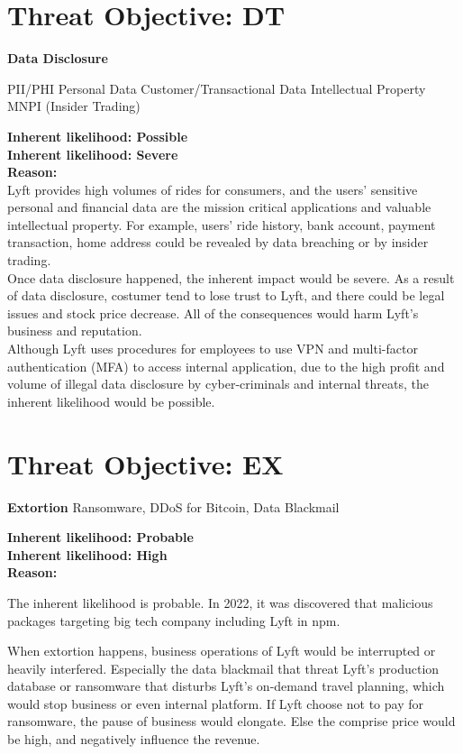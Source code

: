 \documentclass[11pt]{article}
\begin{document}
\section{Threat Objective: DT}
\textbf{Data Disclosure}

PII/PHI Personal Data
Customer/Transactional Data
Intellectual Property
MNPI (Insider Trading)


\begin{boxB}
    \textbf{Inherent likelihood: Possible}\\
    \textbf{Inherent likelihood: Severe}\\
    
    \textbf{Reason: }
    \\
    
    Lyft provides high volumes of rides for consumers, and the users' sensitive personal and financial data are the mission critical applications and valuable intellectual property. For example, users' ride history, bank account, payment transaction, home address could be revealed by data breaching or by insider trading.
\\
    Once data disclosure happened, the inherent impact would be severe. As a result of data disclosure, costumer tend to lose trust to Lyft, and there could be legal issues and stock price decrease. All of the consequences would harm Lyft's business and reputation.
\\
    Although Lyft uses procedures for employees to use VPN and multi-factor authentication (MFA) to access internal application\cite{lyft1}, due to the high profit and volume of illegal data disclosure by cyber-criminals and internal threats, the inherent likelihood would be possible.


\end{boxB}


\section{Threat Objective: EX}

\textbf{Extortion}
Ransomware, DDoS for Bitcoin, Data Blackmail




\begin{boxb}
    \textbf{Inherent likelihood: Probable}\\
    \textbf{Inherent likelihood: High}\\
    \textbf{Reason: }

The inherent likelihood is probable. In 2022, it was discovered that malicious packages targeting big tech company including Lyft in npm.

When extortion happens, business operations of Lyft would be interrupted or heavily interfered. Especially the data blackmail that threat Lyft's production database or ransomware that disturbs Lyft's on-demand travel planning, which would stop business or even internal platform. If Lyft choose not to pay for ransomware, the pause of business would elongate. Else the comprise price would be high, and negatively influence the revenue.

    \\
\end{boxb}
\end{document}
